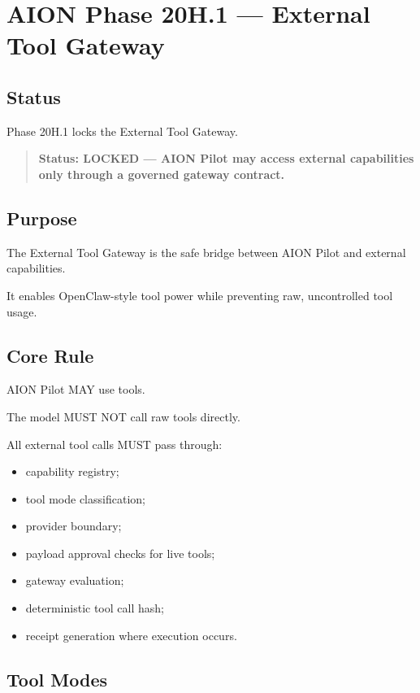 \section{AION Phase 20H.1 --- External Tool Gateway}
\label{sec:aion-phase20h1-external-tool-gateway}

\subsection{Status}

Phase 20H.1 locks the External Tool Gateway.

\begin{quote}
\textbf{Status: LOCKED --- AION Pilot may access external capabilities only through a governed gateway contract.}
\end{quote}

\subsection{Purpose}

The External Tool Gateway is the safe bridge between AION Pilot and external capabilities.

It enables OpenClaw-style tool power while preventing raw, uncontrolled tool usage.

\subsection{Core Rule}

AION Pilot MAY use tools.

The model MUST NOT call raw tools directly.

All external tool calls MUST pass through:

\begin{itemize}
  \item capability registry;
  \item tool mode classification;
  \item provider boundary;
  \item payload approval checks for live tools;
  \item gateway evaluation;
  \item deterministic tool call hash;
  \item receipt generation where execution occurs.
\end{itemize}

\subsection{Tool Modes}

